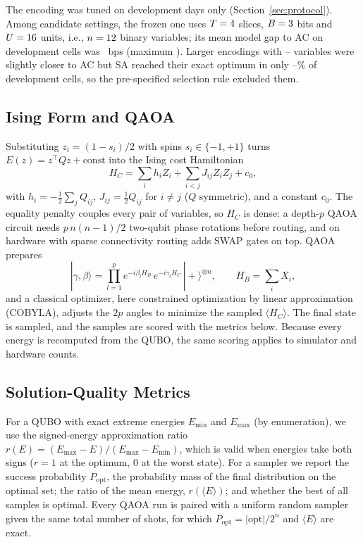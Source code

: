\documentclass[journal]{IEEEtran}
\newcommand{\Popt}{P_{\mathrm{opt}}}
\begin{document}
The encoding was tuned on development days only (Section~\ref{sec:protocol}). Among
\TuneNumCandidates{} candidate settings, the frozen one uses $T=4$ slices,
$B=3$ bits and $U=16$ units, i.e., $n=12$ binary variables; its
mean model gap to AC on development cells was \TuneGapMean{}~bps (maximum \TuneGapMax{}).
Larger encodings with \TuneLargeMinVars{}--\TuneLargeMaxVars{} variables were slightly closer
to AC but SA reached their exact optimum in only \TuneLargeDpMin{}--\TuneLargeDpMax\% of
development cells, so the pre-specified selection rule excluded them.

\subsection{Ising Form and QAOA}
\label{sec:qaoa}

Substituting $z_i=(1-s_i)/2$ with spins $s_i\in\{-1,+1\}$ turns $E(z)=z^{\top}Qz+\mathrm{const}$
into the Ising cost Hamiltonian
\begin{equation}
H_C=\sum_i h_i Z_i+\sum_{i<j} J_{ij} Z_i Z_j + c_0,
\end{equation}
with $h_i=-\tfrac12\sum_j Q_{ij}$, $J_{ij}=\tfrac12 Q_{ij}$ for $i\neq j$ ($Q$ symmetric),
and a constant $c_0$. The equality penalty couples every pair of variables, so $H_C$ is
dense: a depth-$p$ QAOA circuit needs $p\,n(n-1)/2$ two-qubit phase rotations before
routing, and on hardware with sparse connectivity routing adds SWAP gates on top. QAOA
prepares
\begin{equation}
|\gamma,\beta\rangle=\prod_{l=1}^{p} e^{-i\beta_l H_B}\, e^{-i\gamma_l H_C}\,
|{+}\rangle^{\otimes n},\qquad H_B=\sum_i X_i,
\end{equation}
and a classical optimizer, here constrained optimization by linear approximation (COBYLA),
adjusts the $2p$ angles to minimize the sampled
$\langle H_C\rangle$. The final state is sampled, and the samples are scored with the
metrics below. Because every energy is recomputed from the QUBO, the same scoring applies to
simulator and hardware counts.

\subsection{Solution-Quality Metrics}
\label{sec:metrics}

For a QUBO with exact extreme energies $E_{\min}$ and $E_{\max}$ (by enumeration), we
use the signed-energy approximation ratio $r(E)=(E_{\max}-E)/(E_{\max}-E_{\min})$, which is
valid when energies take both signs ($r=1$ at the optimum, $0$ at the worst state). For a
sampler we report the success probability $\Popt$, the probability mass of the final
distribution on the optimal set; the ratio of the mean energy, $r(\langle E\rangle)$; and
whether the best of all samples is optimal. Every QAOA run is paired with a uniform random
sampler given the same total number of shots, for which $\Popt=|\mathrm{opt}|/2^n$ and
$\langle E\rangle$ are exact.
\end{document}
